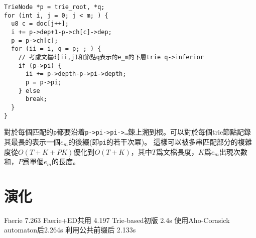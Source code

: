 \begin{verbatim}
TrieNode *p = trie_root, *q;
for (int i, j = 0; j < m; ) {
  u8 c = doc[j++];
  i += p->dep+1-p->ch[c]->dep;
  p = p->ch[c];
  for (ii = i, q = p; ; ) {
    // 考慮文檔d[ii,j)和節點q表示的e_m的下層trie q->inferior
    if (p->pi) {
      ii += p->depth-p->pi->depth;
      p = p->pi;
    } else
      break;
  }
}
\end{verbatim}

對於每個匹配的\texttt{p}都要沿着\texttt{p->pi->pi->\ldots}鍊上溯到根。可以對於每個trie節點記錄其最長的表示一個$e_m$的後綴(即\texttt{pi}的若干次冪)。
這樣可以被多串匹配部分的複雜度從$O(T+K+PK)$優化到$O(T+K)$，其中$T$爲文檔長度，$K$爲$e_m$出現次數和，$P$爲單個$e_m$的長度。

\section{演化}

Faerie 7.263
Faerie+ED共用 4.197
Trie-based初版 2.4s
使用Aho-Corasick automaton后2.264s
利用公共前缀后 2.133s

\printbibliography
